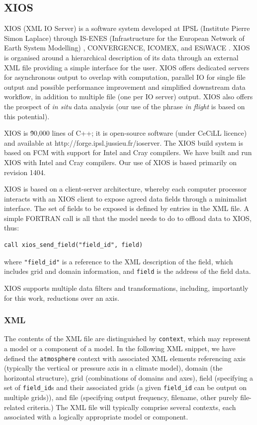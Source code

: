 \documentclass[twocolumn, 5p, times]{elsarticle}
\begin{document}
\subsection{XIOS}

XIOS (XML IO Server) is a software system developed at IPSL (Institute Pierre Simon Laplace) through IS-ENES (Infrastructure for the European Network of Earth System Modelling) \cite{Enes}, CONVERGENCE, ICOMEX, and ESiWACE \cite{Esiwace}. XIOS is organised around a hierarchical description of its data through an external XML file providing a simple interface for the user. XIOS offers dedicated servers for asynchronous output to overlap with computation, parallel IO for single file output and possible performance improvement and simplified downstream data workflow, in addition to multiple file (one per IO server) output. XIOS also offers the prospect of \textit{in situ} data analysis (our use of the phrase \textit{in flight} is based on this potential).  

XIOS is \~90,000 lines of C++; it is open-source software (under CeCiLL licence) and available at http://forge.ipsl.jussieu.fr/ioserver. The XIOS build system is based on FCM \cite{Fcm} with support for Intel and Cray compilers. We have built and run XIOS with Intel and Cray compilers. Our use of XIOS is based primarily on revision 1404.

XIOS is based on a client-server architecture, whereby each computer processor interacts with an XIOS client to expose agreed data fields through a minimalist interface. The set of fields to be exposed is defined by entries in the XML file. A simple FORTRAN call is all that the model needs to do to offload data to XIOS, thus:

\begin{verbatim}
call xios_send_field("field_id", field)
\end{verbatim}
where \texttt{"field\_id"} is a reference to the XML description of the field, which includes grid and domain information, and \texttt{field} is the address of the field data.

XIOS supports multiple data filters and transformations, including, importantly for this work, reductions over an axis.  


\subsubsection{XML}
The contents of the XML file are distinguished by \texttt{context}, which may represent a model or a component of a model. In the following XML snippet, we have defined the \texttt{atmosphere} context with associated XML elements referencing axis (typically the vertical or pressure axis in a climate model), domain (the horizontal structure), grid (combinations of domains and axes), field (specifying a set of \texttt{field\_id}s and their associated grids (a given \texttt{field\_id} can be output on multiple grids)), and file (specifying  output frequency, filename, other purely file-related criteria.) The XML file will typically comprise several contexts, each associated with a logically appropriate model or component.  
\end{document}
